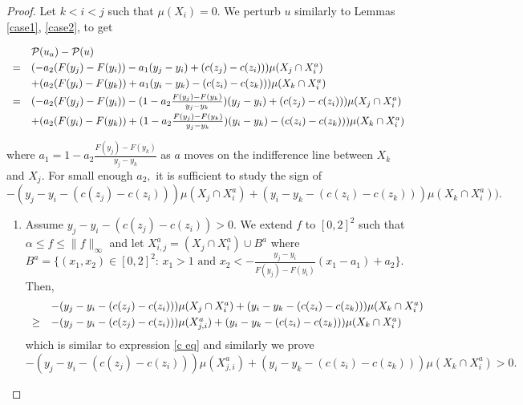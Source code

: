 \documentclass[12pt,reqno]{amsart}
\begin{document}
\begin{proof}

Let $k<i<j$ such that $\mu(X_i)=0.$ We perturb $u$ similarly to  Lemmas \ref{case1}, \ref{case2}, to get

\[\begin{array}{ll} &\mathcal{P}(u_a)-\mathcal{P}(u) \vspace{3pt}\\
      =& (-a_2(F(y_j)-F(y_i))-a_1(y_j-y_i)+(c(z_j)-c(z_i)))\mu( X_j\cap X_i^a)
      \vspace{3pt}\\
      &+(a_2(F(y_i)-F(y_k))+a_1(y_i-y_k)-(c(z_i)-c(z_k)))\mu( X_k\cap X_i^a)\vspace{3pt}\\
      
      =&(-a_2(F(y_j)-F(y_i))-(1-a_2\frac{F(y_j)-F(y_k)}{y_j-y_k})(y_j-y_i)+(c(z_j)-c(z_i)))\mu( X_j\cap X_i^a)\vspace{3pt}\\
      &+(a_2(F(y_i)-F(y_k))+(1-a_2\frac{F(y_j)-F(y_k)}{y_j-y_k})(y_i-y_k)-(c(z_i)-c(z_k)))\mu( X_k\cap X_i^a)\vspace{3pt}\\
      \end{array}\]
    where $a_1=1-a_2\frac{F(y_j)-F(y_k)}{y_j-y_k}$ as $a$ moves on the indifference line between $X_k$ and $X_j.$ For small enough $a_2,$ it is sufficient to study the sign of 
    \begin{equation}\label{exp}-(y_j-y_i-(c(z_j)-c(z_i)))\mu( X_j\cap X_i^a)+(y_i-y_k-(c(z_i)-c(z_k)))\mu( X_k\cap X_i^a)).\end{equation}
\begin{enumerate}
     

\item Assume $y_j-y_i-(c(z_j)-c(z_i))>0.$ We extend $f$ to $[0,2]^2$ such that $\alpha\le f\le \|f\|_\infty$ and let $X_{i,j}^a=(X_j\cap X_i^a)\cup B^a$ where $B^a=\{(x_1,x_2)\in [0,2]^2:\, x_1>1 \text{ and } x_2<-\frac{y_j-y_i}{F(y_j)-F(y_i)}(x_1-a_1)+a_2\}.$ Then,
\[\begin{array}{ll}
&-(y_j-y_i-(c(z_j)-c(z_i)))\mu( X_j\cap X_i^a)+(y_i-y_k-(c(z_i)-c(z_k)))\mu( X_k\cap X_i^a)\vspace{3pt}\\
\ge&-(y_j-y_i-(c(z_j)-c(z_i)))\mu( X_{j,i}^a)+(y_i-y_k-(c(z_i)-c(z_k)))\mu( X_k\cap X_i^a)
\end{array}\] which is similar to expression \eqref{c eq} and similarly we prove 
\[-(y_j-y_i-(c(z_j)-c(z_i)))\mu( X_{j,i}^a)+(y_i-y_k-(c(z_i)-c(z_k)))\mu( X_k\cap X_i^a)>0.\]


\end{enumerate}
\end{proof}
\end{document}
